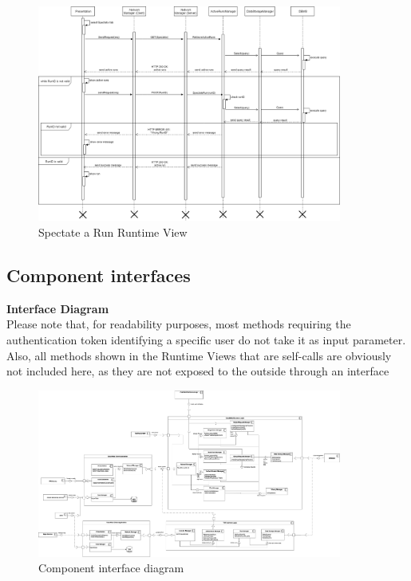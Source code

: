 \documentclass[titlepage]{article}
\begin{document}
\begin{figure}[H]
	\center
  	\includegraphics[width=10cm]{Spectate.png} %
  	\caption{Spectate a Run Runtime View}
 	\label{fig:SPEC}
\end{figure}

\pagebreak



\subsection{Component interfaces}

{\bf Interface Diagram }\\ 
Please note that, for readability purposes, most methods requiring the authentication token identifying a specific user do not take it as input parameter.
Also, all methods shown in the Runtime Views that are self-calls are obviously not included here, as they are not exposed to the outside through an interface

\begin{figure}[H]
	\center
  	\includegraphics[width=10cm]{ComponentInterfaces.png}
  	\caption{Component interface diagram}
 	\label{fig:INT}
\end{figure}

\pagebreak
\end{document}
